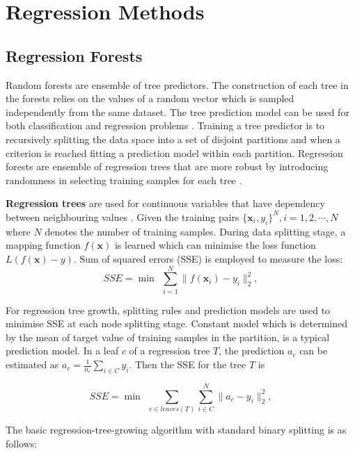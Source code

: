 \documentclass{tutmscthesis}[2010/09/22]
\numberwithin{equation}{section}
\numberwithin{table}{section}
\numberwithin{figure}{section}
\renewcommand{\vec}[1]{\bm{#1}}
\begin{document}
\section{Regression Methods}\label{sec:KRF}

\subsection{Regression Forests} 

Random forests \cite{breiman2001random} are ensemble of tree predictors.
The construction of each tree in the forests relies on the values of a random vector which is sampled independently from the same dataset. 
The tree prediction model can be used for both classification \cite{bosch2007image} and regression problems \cite{sun2012conditional, dantone2012real}. 
Training a tree predictor is to recursively splitting the data space into a set of disjoint partitions and when a criterion is reached fitting a prediction model within each partition.
Regression forests are ensemble of regression trees that are more robust by introducing randomness in selecting training samples for each tree   \cite{fanelli2011real}. 

\textbf{Regression trees} are used for continuous variables that have dependency between neighbouring values \cite{loh2011classification}. 
Given the training pairs $\{\vec{x}_i, y_i\}^N, i = 1, 2, \cdots , N$ where $N$ denotes the number of training samples. 
During data splitting stage, a mapping function $f(\vec{x})$ is learned which can minimise the loss function $L(f(\vec{x})-y)$. Sum of squared errors (SSE) is employed to measure the loss:
\begin{equation}
SSE = \min ~~\sum_{i=1}^N \|f(\vec{x}_i)-y_i\|_2^2,\label{eqn:obj}
\end{equation}

For regression tree growth, splitting rules and prediction models are used to minimise SSE at each node splitting stage. 
Constant model which is determined by the mean of target value of training samples in the partition, is a typical prediction model. 
In a leaf $c$ of a regression tree $T$, the prediction $a_c$ can be estimated as $a_c = \frac{1}{n_c}\sum_{i \in C}y_i$. Then the SSE for the tree $T$ is

\begin{equation}
SSE = \min ~~\sum_{c \in leaves(T)}\sum_{i \in C}^N \|a_c-y_i\|_2^2,\label{eqn:obj}
\end{equation}

The basic regression-tree-growing algorithm with standard binary splitting is as follows:
\end{document}

